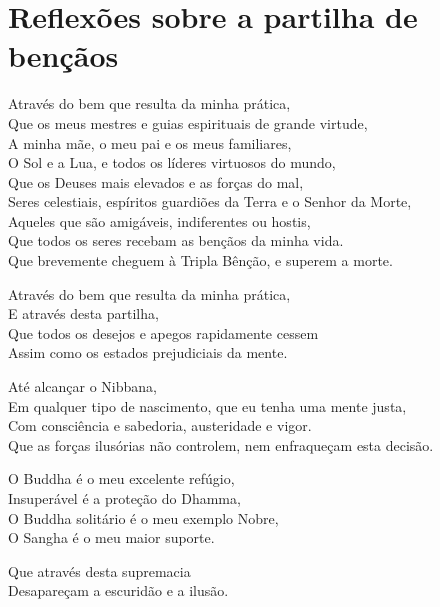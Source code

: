 \chapter[Reflexões sobre a partilha de bençãos]{Reflexões sobre a partilha de bençãos}

\begin{leader}
\end{leader}

Através do bem que resulta da minha prática,\\
Que os meus mestres e guias espirituais de grande virtude,\\
A minha mãe, o meu pai e os meus familiares,\\
O Sol e a Lua, e todos os líderes virtuosos do mundo,\\
Que os Deuses mais elevados e as forças do mal,\\
Seres celestiais, espíritos guardiões da Terra e o Senhor da Morte,\\
Aqueles que são amigáveis, indiferentes ou hostis,\\
Que todos os seres recebam as bençãos da minha vida.\\
Que brevemente cheguem à Tripla Bênção, e superem a morte.

Através do bem que resulta da minha prática,\\
E através desta partilha,\\
Que todos os desejos e apegos rapidamente cessem\\
Assim como os estados prejudiciais da mente.

Até alcançar o Nibbana,\\
Em qualquer tipo de nascimento, que eu tenha uma mente justa,\\
Com consciência e sabedoria, austeridade e vigor.\\
Que as forças ilusórias não controlem, nem enfraqueçam esta decisão.

O Buddha é o meu excelente refúgio,\\
Insuperável é a proteção do Dhamma,\\
O Buddha solitário é o meu exemplo Nobre,\\
O Sangha é o meu maior suporte.

Que através desta supremacia\\
Desapareçam a escuridão e a ilusão.

